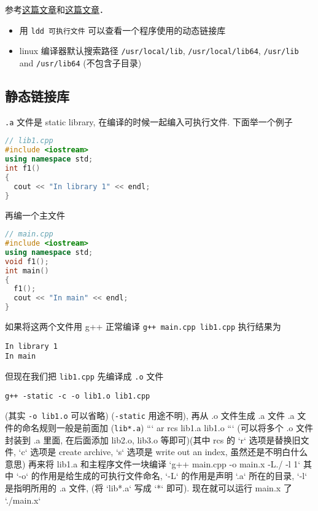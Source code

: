 
参考\href{https://blog.feabhas.com/2014/04/static-and-dynamic-libraries-on-linux/}{这篇文章}和\href{https://gcc.gnu.org/onlinedocs/gcc/Link-Options.html}{这篇文章}．

\begin{itemize}
\item 用 \verb`ldd 可执行文件` 可以查看一个程序使用的动态链接库
\item linux 编译器默认搜索路径 \verb`/usr/local/lib`, \verb`/usr/local/lib64`, \verb`/usr/lib` and \verb`/usr/lib64` (不包含子目录)
\end{itemize}

\subsection{静态链接库}

\verb|.a| 文件是 static library, 在编译的时候一起编入可执行文件. 下面举一个例子

\begin{lstlisting}[language=cpp]
// lib1.cpp
#include <iostream>
using namespace std;
int f1()
{
  cout << "In library 1" << endl;
}
\end{lstlisting}

再编一个主文件

\begin{lstlisting}[language=cpp]
// main.cpp
#include <iostream>
using namespace std;
void f1();
int main()
{
  f1();
  cout << "In main" << endl;
}
\end{lstlisting}

如果将这两个文件用 g++ 正常编译 \verb`g++ main.cpp lib1.cpp` 执行结果为
\begin{lstlisting}
In library 1
In main
\end{lstlisting}
但现在我们把 \verb|lib1.cpp| 先编译成 \verb|.o| 文件

\verb`g++ -static -c -o lib1.o lib1.cpp`

(其实 \verb`-o lib1.o` 可以省略) (\verb`-static` 用途不明), 再从 .o 文件生成 .a 文件 .a 文件的命名规则一般是前面加 (\verb`lib*.a`)
```
ar rcs lib1.a lib1.o
```
(可以将多个 .o 文件封装到 .a 里面, 在后面添加 lib2.o, lib3.o 等即可)(其中 rcs 的 `r` 选项是替换旧文件, `c` 选项是 create archive, `s` 选项是 write out an index, 虽然还是不明白什么意思) 再来将 lib1.a 和主程序文件一块编译
`g++ main.cpp -o main.x -L./ -l 1`
其中 `-o` 的作用是给生成的可执行文件命名, `-L` 的作用是声明 `.a` 所在的目录, `-l` 是指明所用的 .a 文件, (将 `lib*.a` 写成 `*` 即可).
现在就可以运行 main.x 了
`./main.x`

